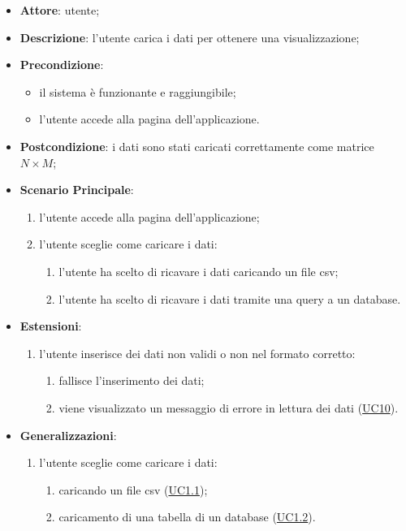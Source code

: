     \begin{itemize}
    \item \textbf{Attore}: utente;
    \item \textbf{Descrizione}: l'utente carica i dati per ottenere una visualizzazione;
    \item \textbf{Precondizione}:
    \begin{itemize}
        \item il sistema è funzionante e raggiungibile;
        \item l'utente accede alla pagina dell'applicazione.
    \end{itemize}
    \item \textbf{Postcondizione}: i dati sono stati caricati correttamente come matrice $N\times M$;
    \item \textbf{Scenario Principale}: 
        \begin{enumerate}
            \item l'utente accede alla pagina dell'applicazione;
            \item l'utente sceglie come caricare i dati:
                \begin{enumerate}
                    \item l'utente ha scelto di ricavare i dati caricando un file csv;
                    \item l'utente ha scelto di ricavare i dati tramite una query a un database.
                \end{enumerate}
        \end{enumerate}  
    \item \textbf{Estensioni}:
        \begin{enumerate}
            \item l'utente inserisce dei dati non validi o non nel formato corretto:
                \begin{enumerate}
                    \item fallisce l'inserimento dei dati;
                    \item viene visualizzato un messaggio di errore in lettura dei dati (\hyperref[uc10]{UC10}).
                \end{enumerate}
        \end{enumerate}  
    \item \textbf{Generalizzazioni}:
        \begin{enumerate}
            \item l'utente sceglie come caricare i dati:
                \begin{enumerate}
                    \item caricando un file csv (\hyperref[uc1.1]{UC1.1});
                    \item caricamento di una tabella di un database (\hyperref[uc1.2]{UC1.2}).
                \end{enumerate}
        \end{enumerate}  
    \end{itemize}
    
